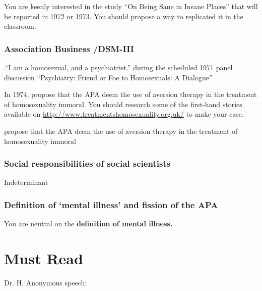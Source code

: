 \begin{refsection}
You are keenly interested in the study “On Being Sane in Insane Places” that will be reported in 1972 or 1973. You should propose a way to replicated it in the classroom.

\subsubsection{Association Business \slash  DSM-III}
\label{associationbusinessdsm-iii}

\begin{writingtask}[Fryer]\label{writingtask:fryer}
.“I am a homosexual, and a psychiatrist.” during the scheduled 1971 panel discussion “Psychiatry: Friend or Foe to Homosexuals: A Dialogue”
\end{writingtask}

In 1974, propose that the APA deem the use of aversion therapy in the treatment of homosexuality immoral. You should research some of the first-hand stories available on \url{http://www.treatmentshomosexuality.org.uk/} to make your case.

\begin{proposal}[Fryer]\label{proposal:fryer}
propose that the APA deem the use of aversion therapy in the treatment of homosexuality immoral\end{proposal}

\subsubsection{Social responsibilities of social scientists}
\label{socialresponsibilitiesofsocialscientists}

Indeterminant

\subsubsection{Definition of ‘mental illness’ and fission of the APA}
\label{definitionof‘mentalillness’andfissionoftheapa}

You are neutral on the \textbf{definition of mental illness.}

\section{Must Read}
\label{mustread}

Dr. H. Anonymous speech:

\begin{quote}


\end{quote}
\end{refsection}
